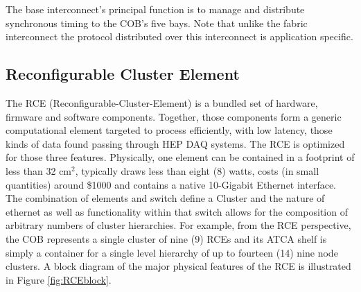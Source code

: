 The base interconnect's principal function is to manage 
and distribute synchronous timing to the COB's five bays.
Note that unlike the fabric interconnect the protocol 
distributed over this interconnect is application specific. 


\subsection{Reconfigurable Cluster Element}
\label{sec:RCE}
The RCE (Reconfigurable-Cluster-Element) is a bundled set of hardware, 
firmware and software components. 
Together, those components form a generic computational element 
targeted to process efficiently, with low latency, those
kinds of data found passing through HEP DAQ systems. 
The RCE is optimized for those three features. 
Physically, one element can be contained in a footprint of less than 32 cm$^2$, 
typically draws less than eight (8) watts, costs (in small quantities) 
around \$1000 and contains a native 10-Gigabit Ethernet interface. 
The combination of elements and switch define a Cluster and 
the nature of ethernet as well as functionality within that switch 
allows for the composition of arbitrary numbers of cluster hierarchies. 
For example, from the RCE perspective, the COB represents a single cluster 
of nine (9) RCEs and its ATCA shelf is simply a container for a 
single level hierarchy of up to fourteen (14) nine node clusters. 
A block diagram of the major physical features of the RCE is illustrated in Figure 
\ref{fig:RCEblock}.

